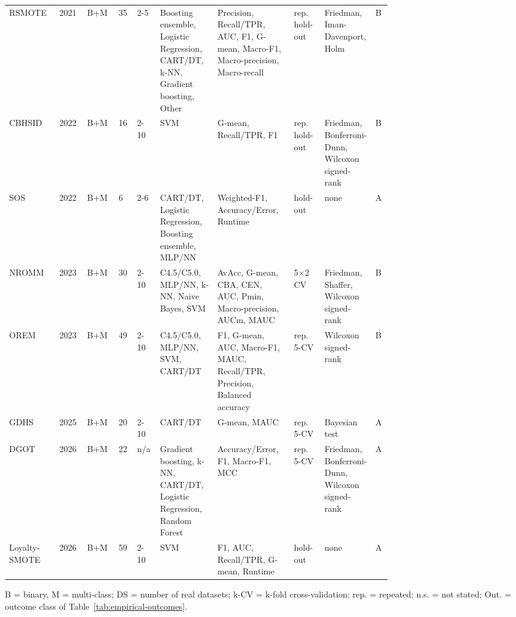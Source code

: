 \begin{longtable}{@{}p{0.13\linewidth}lllp{0.06\linewidth}p{0.15\linewidth}p{0.2\linewidth}p{0.08\linewidth}p{0.11\linewidth}l@{}}
RSMOTE~\parencite{chen2021rsmote} & 2021 & B+M & 35 & 2-5 & Boosting ensemble, Logistic Regression, CART/DT, k-NN, Gradient boosting, Other & Precision, Recall/TPR, AUC, F1, G-mean, Macro-F1, Macro-precision, Macro-recall & rep. hold-out & Friedman, Iman-Davenport, Holm & B\\
CBHSID~\parencite{palli2022cbhsid} & 2022 & B+M & 16 & 2-10 & SVM & G-mean, Recall/TPR, F1 & rep. hold-out & Friedman, Bonferroni-Dunn, Wilcoxon signed-rank & B\\
SOS~\parencite{kim2022sos} & 2022 & B+M & 6 & 2-6 & CART/DT, Logistic Regression, Boosting ensemble, MLP/NN & Weighted-F1, Accuracy/Error, Runtime & hold-out & none & A\\
NROMM~\parencite{liu2023nromm} & 2023 & B+M & 30 & 2-10 & C4.5/C5.0, MLP/NN, k-NN, Naive Bayes, SVM & AvAcc, G-mean, CBA, CEN, AUC, Pmin, Macro-precision, AUCm, MAUC & 5$\times$2 CV & Friedman, Shaffer, Wilcoxon signed-rank & B\\
OREM~\parencite{zhu2023orem} & 2023 & B+M & 49 & 2-10 & C4.5/C5.0, MLP/NN, SVM, CART/DT & F1, G-mean, AUC, Macro-F1, MAUC, Recall/TPR, Precision, Balanced accuracy & rep. 5-CV & Wilcoxon signed-rank & B\\
GDHS~\parencite{yan2025gdhs} & 2025 & B+M & 20 & 2-10 & CART/DT & G-mean, MAUC & rep. 5-CV & Bayesian test & A\\
DGOT~\parencite{ren2026dgot} & 2026 & B+M & 22 & n/a & Gradient boosting, k-NN, CART/DT, Logistic Regression, Random Forest & Accuracy/Error, F1, Macro-F1, MCC & rep. 5-CV & Friedman, Bonferroni-Dunn, Wilcoxon signed-rank & A\\
Loyalty-SMOTE~\parencite{hu2026loyalty} & 2026 & B+M & 59 & 2-10 & SVM & F1, AUC, Recall/TPR, G-mean, Runtime & hold-out & none & A\\
\end{longtable}
\par\noindent B = binary, M = multi-class; DS = number of real datasets; k-CV = k-fold cross-validation; rep. = repeated; n.s. = not stated; Out. = outcome class of Table~\ref{tab:empirical-outcomes}.
\endgroup
